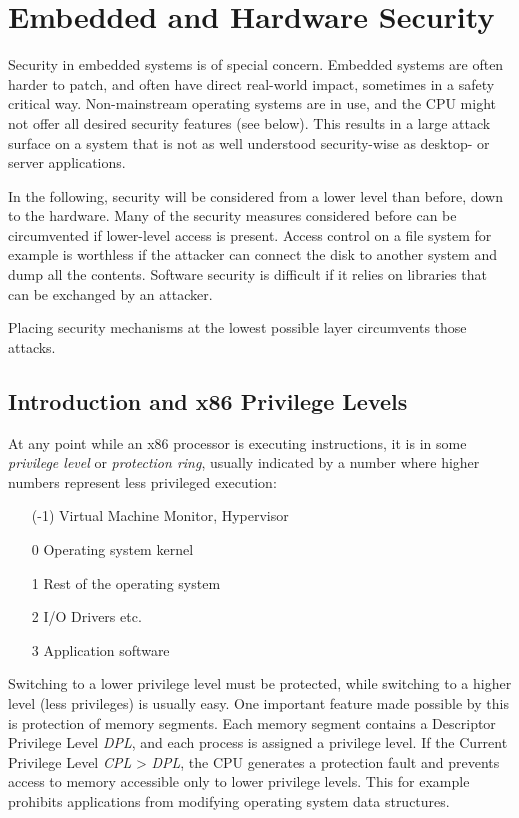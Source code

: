 \chapter{Embedded and Hardware Security}

Security in embedded systems is of special concern. Embedded systems are often
harder to patch, and often have direct real-world impact, sometimes in a safety
critical way. Non-mainstream operating systems are in use, and the CPU might not
offer all desired security features (see below). This results in a large attack
surface on a system that is not as well understood security-wise as desktop- or
server applications.

In the following, security will be considered from a lower level than before,
down to the hardware. Many of the security measures considered before can be
circumvented if lower-level access is present. Access control on a file system
for example is worthless if the attacker can connect the disk to another system
and dump all the contents. Software security is difficult if it relies on
libraries that can be exchanged by an attacker.

Placing security mechanisms at the lowest possible layer circumvents those
attacks.

\section{Introduction and x86 Privilege Levels}
At any point while an x86 processor is executing instructions, it is in some
\emph{privilege level} or \emph{protection ring}, usually indicated by a number
where higher numbers represent less privileged execution:

\begin{itemize}
    \item[(-1)] Virtual Machine Monitor, Hypervisor
    \item[0] Operating system kernel
    \item[1] Rest of the operating system
    \item[2] I/O Drivers etc.
    \item[3] Application software
\end{itemize}

Switching to a lower privilege level must be protected, while switching to a
higher level (less privileges) is usually easy. One important feature made
possible by this is protection of memory segments. Each memory segment contains
a Descriptor Privilege Level \textit{DPL}, and each process is assigned a
privilege level. If the Current Privilege Level \textit{CPL} > \textit{DPL}, the
CPU generates a protection fault and prevents access to memory accessible only
to lower privilege levels. This for example prohibits applications from
modifying operating system data structures.


